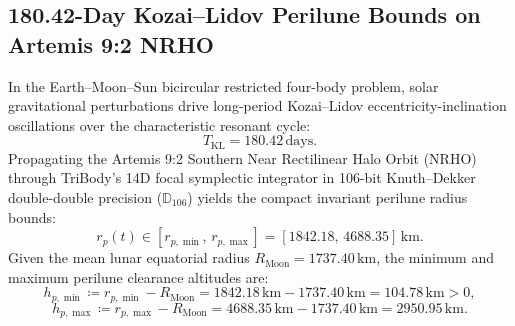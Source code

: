 \documentclass[11pt,a4paper,reqno]{article}
\theoremstyle{plain}
\theoremstyle{definition}
\theoremstyle{remark}
\numberwithin{equation}{section}
\newcommand{\Ddd}{\mathbb{D}_{106}}
\begin{document}
\subsection{180.42-Day Kozai--Lidov Perilune Bounds on Artemis 9:2 NRHO}
In the Earth--Moon--Sun bicircular restricted four-body problem, solar gravitational perturbations drive long-period Kozai--Lidov eccentricity-inclination oscillations over the characteristic resonant cycle:
\begin{equation}
  T_{\mathrm{KL}} = 180.42\,\mathrm{days}.
\end{equation}
Propagating the Artemis 9:2 Southern Near Rectilinear Halo Orbit (NRHO) through TriBody's 14D focal symplectic integrator in 106-bit Knuth--Dekker double-double precision ($\Ddd$) yields the compact invariant perilune radius bounds:
\begin{equation}
  r_p(t) \in [r_{p,\min}, \, r_{p,\max}] = [1842.18, \, 4688.35]\,\mathrm{km}.
\end{equation}
Given the mean lunar equatorial radius $R_{\mathrm{Moon}} = 1737.40\,\mathrm{km}$, the minimum and maximum perilune clearance altitudes are:
\begin{equation}
  h_{p,\min} \coloneqq r_{p,\min} - R_{\mathrm{Moon}} = 1842.18\,\mathrm{km} - 1737.40\,\mathrm{km} = 104.78\,\mathrm{km} > 0,
\end{equation}
\begin{equation}
  h_{p,\max} \coloneqq r_{p,\max} - R_{\mathrm{Moon}} = 4688.35\,\mathrm{km} - 1737.40\,\mathrm{km} = 2950.95\,\mathrm{km}.
\end{equation}
\end{document}
